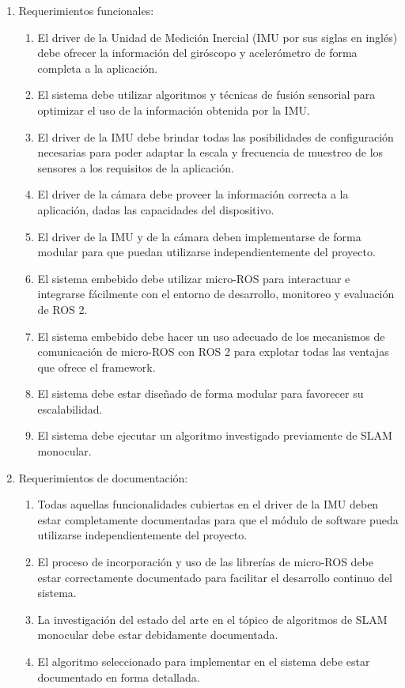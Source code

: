 \documentclass[
11pt, %
codirector, %
]{charter}
\begin{document}
\begin{enumerate}
\item Requerimientos funcionales:
\begin{enumerate}
	\item El driver de la Unidad de Medición Inercial (IMU por sus siglas en inglés) debe ofrecer la información del giróscopo y acelerómetro de forma completa a la aplicación.
	\item El sistema debe utilizar algoritmos y técnicas de fusión sensorial para optimizar el uso de la información obtenida por la IMU.
	\item El driver de la IMU debe brindar todas las posibilidades de configuración necesarias para poder adaptar la escala y frecuencia de muestreo de los sensores a los requisitos de la aplicación.
	\item El driver de la cámara debe proveer la información correcta a la aplicación, dadas las capacidades del dispositivo.
	\item El driver de la IMU y de la cámara deben implementarse de forma modular para que puedan utilizarse independientemente del proyecto.
	\item El sistema embebido debe utilizar micro-ROS para interactuar e integrarse fácilmente con el entorno de desarrollo, monitoreo y evaluación de ROS 2.
	\item El sistema embebido debe hacer un uso adecuado de los mecanismos de comunicación de micro-ROS con ROS 2 para explotar todas las ventajas que ofrece el framework.
	\item El sistema debe estar diseñado de forma modular para favorecer su escalabilidad.
	\item El sistema debe ejecutar un algoritmo investigado previamente de SLAM monocular.
\end{enumerate}

\item Requerimientos de documentación:
\begin{enumerate}
	\item Todas aquellas funcionalidades cubiertas en el driver de la IMU deben estar completamente documentadas para que el módulo de software pueda utilizarse independientemente del proyecto.
	\item El proceso de incorporación y uso de las librerías de micro-ROS debe estar correctamente documentado para facilitar el desarrollo continuo del sistema.
	\item La investigación del estado del arte en el tópico de algoritmos de SLAM monocular debe estar debidamente documentada.
	\item El algoritmo seleccionado para implementar en el sistema debe estar documentado en forma detallada.
\end{enumerate}


\end{enumerate}
\end{document}
